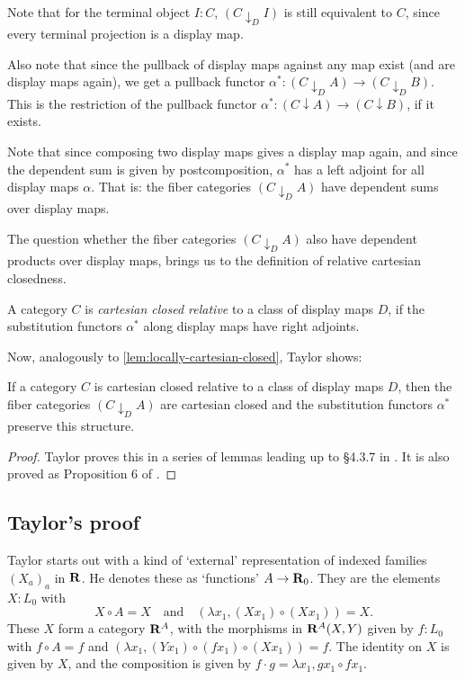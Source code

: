 Note that for the terminal object $ I : C $, $ (C \downarrow_D I) $ is still equivalent to $ C $, since every terminal projection is a display map.

Also note that since the pullback of display maps against any map exist (and are display maps again), we get a pullback functor $ \alpha^*: (C \downarrow_D A) \to (C \downarrow_D B) $. This is the restriction of the pullback functor $ \alpha^*: (C \downarrow A) \to (C \downarrow B) $, if it exists.

Note that since composing two display maps gives a display map again, and since the dependent sum is given by postcomposition, $ \alpha^* $ has a left adjoint for all display maps $ \alpha $. That is: the fiber categories $ (C \downarrow_D A) $ have dependent sums over display maps.

The question whether the fiber categories $ (C \downarrow_D A) $ also have dependent products over display maps, brings us to the definition of relative cartesian closedness.
\begin{definition}
  A category $ C $ is \textit{cartesian closed relative} to a class of display maps $ D $, if the substitution functors $ \alpha^* $ along display maps have right adjoints.
\end{definition}

Now, analogously to \ref{lem:locally-cartesian-closed}, Taylor shows:
\begin{lemma}
  If a category $ C $ is cartesian closed relative to a class of display maps $ D $, then the fiber categories $ (C \downarrow_D A) $ are cartesian closed and the substitution functors $ \alpha^* $ preserve this structure.
\end{lemma}
\begin{proof}
  Taylor proves this in a series of lemmas leading up to \S 4.3.7 in \cite{taylor}. It is also proved as Proposition 6 of \cite{theory-of-constructions}.
\end{proof}

\subsection{Taylor's proof}

Taylor starts out with a kind of `external' representation of indexed families $ (X_a)_a $ in $ \mathbf{R} $. He denotes these as `functions' $ A \to \mathbf{R}_0 $. They are the elements $ X: L_0 $ with
\[ X \circ A = X \quad \text{and} \quad (\lambda x_1, (X x_1) \circ (X x_1)) = X. \]
These $ X $ form a category $ \mathbf{R}^A $, with the morphisms in $ \mathbf{R}^A(X, Y) $ given by $ f: L_0 $ with $ f \circ A = f $ and $ (\lambda x_1, (Y x_1) \circ (f x_1) \circ (X x_1)) = f $. The identity on $ X $ is given by $ X $, and the composition is given by $ f \cdot g = \lambda x_1, g x_1 \circ f x_1 $.

